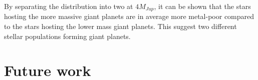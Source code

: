 By separating the distribution into two at $4M_{Jup}$, it can be shown \citep[see][for
details]{Santos2017} that the stars hosting the more massive giant planets are in average more
metal-poor compared to the stars hosting the lower mass giant planets. This suggest two different
stellar populations forming giant planets.


\section{Future work}
